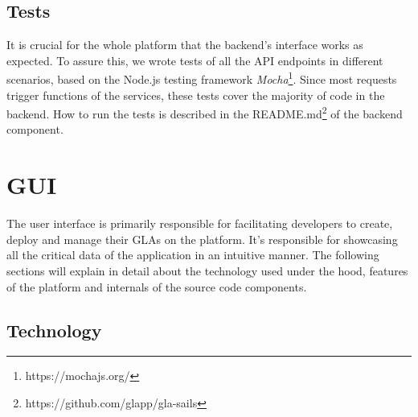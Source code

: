 \documentclass{seal_thesis}
\begin{document}
\subsection{Tests}
It is crucial for the whole platform that the backend's interface works as expected.
To assure this, we wrote tests of all the API endpoints in different scenarios, based on the Node.js testing framework \textit{Mocha}\footnote{https://mochajs.org/}.
Since most requests trigger functions of the services, these tests cover the majority of code in the backend.
How to run the tests is described in the README.md\footnote{https://github.com/glapp/gla-sails} of the backend component.


\section{GUI}

The user interface is primarily responsible for facilitating developers to create, deploy and manage their GLAs on the platform. It's responsible for showcasing all the critical data of the application in an intuitive manner. 
The following sections will explain in detail about the technology used under the hood, features of the platform and internals of the source code components.

\subsection{Technology}
\end{document}
